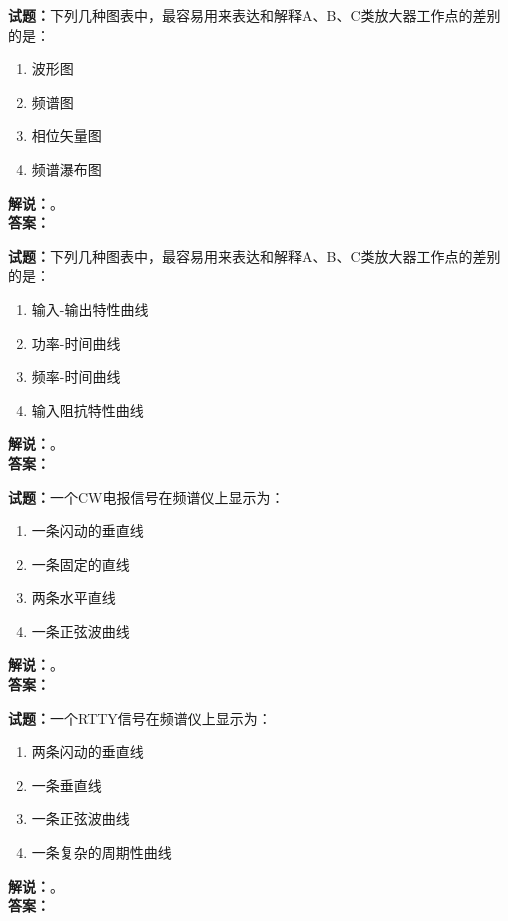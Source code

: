 \documentclass{ctexbook}
\begin{document}
\vspace{\baselineskip}

\noindent\textbf{试题：}下列几种图表中，最容易用来表达和解释A、B、C类放大器工作点的差别的是：
\begin{enumerate}[leftmargin=3em]
  \item 波形图
  \item 频谱图
  \item 相位矢量图
  \item 频谱瀑布图
\end{enumerate}
\noindent\textbf{解说：}\textbf{}。\\\noindent\textbf{答案：}

\vspace{\baselineskip}

\noindent\textbf{试题：}下列几种图表中，最容易用来表达和解释A、B、C类放大器工作点的差别的是：
\begin{enumerate}[leftmargin=3em]
  \item 输入-输出特性曲线
  \item 功率-时间曲线
  \item 频率-时间曲线
  \item 输入阻抗特性曲线
\end{enumerate}
\noindent\textbf{解说：}\textbf{}。\\\noindent\textbf{答案：}

\vspace{\baselineskip}

\noindent\textbf{试题：}一个CW电报信号在频谱仪上显示为：
\begin{enumerate}[leftmargin=3em]
  \item 一条闪动的垂直线
  \item 一条固定的直线
  \item 两条水平直线
  \item 一条正弦波曲线
\end{enumerate}
\noindent\textbf{解说：}\textbf{}。\\\noindent\textbf{答案：}

\vspace{\baselineskip}

\noindent\textbf{试题：}一个RTTY信号在频谱仪上显示为：
\begin{enumerate}[leftmargin=3em]
  \item 两条闪动的垂直线
  \item 一条垂直线
  \item 一条正弦波曲线
  \item 一条复杂的周期性曲线
\end{enumerate}
\noindent\textbf{解说：}\textbf{}。\\\noindent\textbf{答案：}
\end{document}

